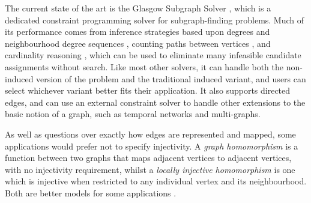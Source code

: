 \documentclass{article}
\begin{document}
The current state of the art is the Glasgow Subgraph Solver \cite{DBLP:conf/gg/McCreeshP020}, which
is a dedicated constraint programming solver for subgraph-finding problems. Much of its performance
comes from inference strategies based upon degrees and neighbourhood degree sequences
\cite{DBLP:journals/constraints/ZampelliDS10}, counting paths between vertices
\cite{DBLP:conf/cp/AudemardLMGP14,DBLP:conf/cp/McCreeshP15}, and cardinality reasoning
\cite{DBLP:journals/ai/Solnon10}, which can be used to eliminate many infeasible candidate
assignments without search. Like most other solvers, it can handle both the non-induced version of
the problem and the traditional induced variant, and users can select whichever variant
better fits their application. It also supports directed edges, and can use an external constraint
solver to handle other extensions to the basic notion of a graph, such as temporal networks and
multi-graphs.

As well as questions over exactly how edges are represented and mapped, some applications would
prefer not to specify injectivity. A \emph{graph homomorphism} is a function between two graphs that
maps adjacent vertices to adjacent vertices, with no injectivity requirement, whilst a \emph{locally
injective homomorphism} is one which is injective when restricted to any individual vertex and its
neighbourhood. Both are better models for some applications
\cite{DBLP:journals/dam/FialaKK01,DBLP:conf/semweb/Baget05,DBLP:conf/iccs/CorbyF07,DBLP:journals/csr/FialaK08,DBLP:journals/pvldb/FanLMWW10,DBLP:journals/tcs/ChaplickFHPT15}.
\end{document}
